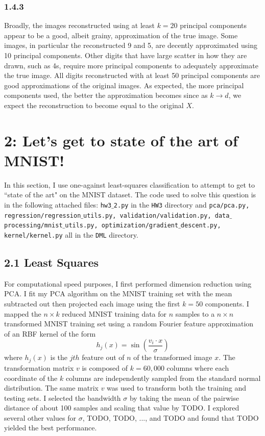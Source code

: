 \documentclass[12pt]{amsart}
\begin{document}
\subsubsection*{1.4.3}

Broadly, the images reconstructed using at least $k = 20$ principal components appear to be a good, albeit grainy, approximation of the true image.  Some images, in particular the reconstructed 9 and 5, are decently approximated using 10 principal components.  Other digits that have large scatter in how they are drawn, such as 4s, require more principal components to adequately approximate the true image.  All digits reconstructed with at least 50 principal components are good approximations of the original images.  As expected, the more principal components used, the better the approximation becomes since as $k \rightarrow d$, we expect the reconstruction to become equal to the original $X$.

\section*{2: Let's get to state of the art of MNIST!}

In this section, I use one-against least-squares classification to attempt to get to ``state of the art" on the MNIST dataset.  The code used to solve this question is in the following attached files: {\tt hw3$\_$2.py} in the {\tt HW3} directory and {\tt pca/pca.py, regression/regression$\_$utils.py, validation/validation.py, data$\_$processing/mnist$\_$utils.py, optimization/gradient$\_$descent.py, kernel/kernel.py} all in the {\tt DML} directory.

\subsection*{2.1 Least Squares}

For computational speed purposes, I first performed dimension reduction using PCA.  I fit my PCA algorithm on the MNIST training set with the mean subtracted out then projected each image using the first $k = 50$ components.  I mapped the $n \times k$ reduced MNIST training data for $n$ samples to a $n \times n$ transformed MNIST training set using a random Fourier feature approximation of an RBF kernel of the form
\begin{equation} \label{eqn:rbf_kernel}
h_j(x) = \sin \left( \frac{v_i \cdot x}{\sigma} \right)
\end{equation}
where $h_j(x)$ is the $jth$ feature out of $n$ of the transformed image $x$.  The transformation matrix $v$ is composed of $k = 60,000$ columns where each coordinate of the $k$ columns are independently sampled from the standard normal distribution.  The same matrix $v$ was used to transform both the training and testing sets.  I selected the bandwidth $\sigma$ by taking the mean of the pairwise distance of about 100 samples and scaling that value by TODO.  I explored several other values for $\sigma$, TODO, TODO, ..., and TODO and found that TODO yielded the best performance.  
\end{document}
